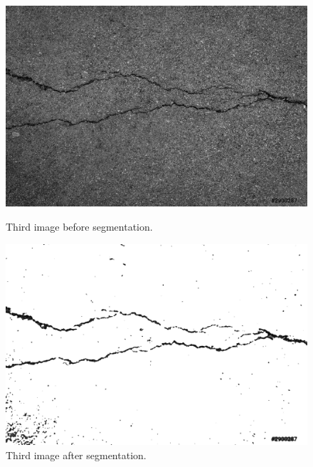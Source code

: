 \begin{figure}[h]
	\centering
	\begin{minipage}{0.45\textwidth}
		\centering
		\includegraphics[width=\linewidth]{images/source/original/3}
		\caption{Third image before segmentation.}
		\label{fig:1e}
        \end{minipage}
        \hspace{0.05\textwidth}
        \begin{minipage}{0.45\textwidth}
        		\centering
		\includegraphics[width=\linewidth]{images/source/task1/3}
		\caption{Third image after segmentation.}
		\label{fig:1f}
        \end{minipage}
\end{figure}

